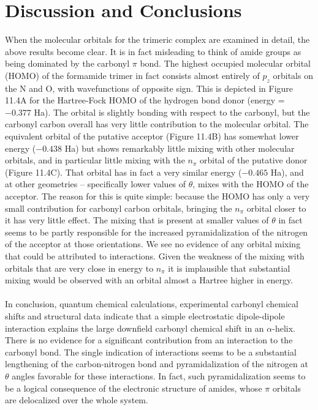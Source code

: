 \section{Discussion and Conclusions}

\begin{doublespace}
When the molecular orbitals for the trimeric complex are examined in detail, 
the above results become clear. It is in fact misleading to think of amide 
groups as being dominated by the carbonyl $\pi$ bond. The highest occupied
molecular orbital (HOMO) of the formamide trimer in fact consists almost
entirely of $p_z$ orbitals on the N and O, with wavefunctions of opposite sign.
This is depicted in Figure 11.4A for the Hartree-Fock HOMO of the hydrogen bond
donor (energy = $-0.377$ Ha). The orbital is slightly bonding with respect to
the carbonyl, but the carbonyl carbon overall has very little contribution to
the molecular orbital. The equivalent orbital of the putative acceptor
(Figure 11.4B) has somewhat lower energy ($-0.438$ Ha) but shows remarkably
little mixing with other molecular orbitals, and in particular little mixing
with the $n_\pi$ orbital of the putative \npipistar{} donor (Figure 11.4C).
That orbital has in fact a very similar energy ($-0.465$ Ha), and at other
geometries -- specifically lower values of $\theta$, mixes with the HOMO of
the acceptor. The reason for this is quite simple: because the HOMO has only a
very small contribution for carbonyl carbon orbitals, bringing the $n_\pi$
orbital closer to it has very little effect. The mixing that is present at
smaller values of $\theta$ in fact seems to be partly responsible for the
increased pyramidalization of the nitrogen of the acceptor at those
orientations. We see no evidence of any orbital mixing that could be attributed
to \npipistar{} interactions. Given the weakness of the mixing with orbitals
that are very close in energy to $n_\pi$ it is implausible that substantial
mixing would be observed with an orbital almost a Hartree higher in energy.
\\\\
In conclusion, quantum chemical calculations, experimental carbonyl \cnmr{}
chemical shifts and structural data indicate that a simple electrostatic
dipole-dipole interaction explains the large downfield carbonyl \cnmr{}
chemical shift in an $\alpha$-helix. There is no evidence for a significant
contribution from an \npistar{} interaction to the carbonyl bond. The single
indication of \npistar{} interactions seems to be a substantial lengthening of
the carbon-nitrogen bond and pyramidalization of the nitrogen at $\theta$
angles favorable for these interactions. In fact, such pyramidalization seems
to be a logical consequence of the electronic structure of amides, whose $\pi$
orbitals are delocalized over the whole system.
\end{doublespace}





